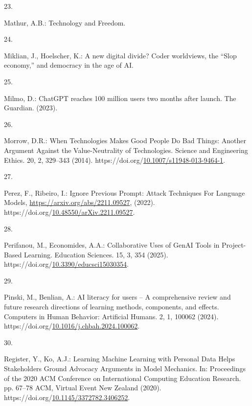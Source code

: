\documentclass[
  letterpaper,
  DIV=11,
  numbers=noendperiod]{scrartcl}
\newlength{\cslhangindent}
\newlength{\csllabelwidth}
\newenvironment{CSLReferences}[2] %
 {\begin{list}{}{%
  \setlength{\itemindent}{0pt}
  \setlength{\leftmargin}{0pt}
  \setlength{\parsep}{0pt}
  \ifodd #1
   \setlength{\leftmargin}{\cslhangindent}
   \setlength{\itemindent}{-1\cslhangindent}
  \fi
  \setlength{\itemsep}{#2\baselineskip}}}
 {\end{list}}
\newcommand{\CSLLeftMargin}[1]{\parbox[t]{\csllabelwidth}{\strut#1\strut}}
\newcommand{\CSLRightInline}[1]{\parbox[t]{\linewidth - \csllabelwidth}{\strut#1\strut}}
\begin{document}
\begin{CSLReferences}{0}{0}
\CSLLeftMargin{23. }%
\CSLRightInline{Mathur, A.B.: Technology and {Freedom}.}

\CSLLeftMargin{24. }%
\CSLRightInline{Miklian, J., Hoelscher, K.: A new digital divide?
{Coder} worldviews, the {``{Slop} economy,''} and democracy in the age
of {AI}.}

\CSLLeftMargin{25. }%
\CSLRightInline{Milmo, D.: {ChatGPT} reaches 100 million users two
months after launch. The Guardian. (2023).}

\CSLLeftMargin{26. }%
\CSLRightInline{Morrow, D.R.: When {Technologies Makes Good People Do
Bad Things}: {Another Argument Against} the {Value-Neutrality} of
{Technologies}. Science and Engineering Ethics. 20, 2, 329--343 (2014).
https://doi.org/\href{https://doi.org/10.1007/s11948-013-9464-1}{10.1007/s11948-013-9464-1}.}

\CSLLeftMargin{27. }%
\CSLRightInline{Perez, F., Ribeiro, I.: Ignore {Previous Prompt}:
{Attack Techniques For Language Models},
\url{https://arxiv.org/abs/2211.09527}, (2022).
https://doi.org/\href{https://doi.org/10.48550/arXiv.2211.09527}{10.48550/arXiv.2211.09527}.}

\CSLLeftMargin{28. }%
\CSLRightInline{Perifanou, M., Economides, A.A.: Collaborative {Uses} of
{GenAI Tools} in {Project-Based Learning}. Education Sciences. 15, 3,
354 (2025).
https://doi.org/\href{https://doi.org/10.3390/educsci15030354}{10.3390/educsci15030354}.}

\CSLLeftMargin{29. }%
\CSLRightInline{Pinski, M., Benlian, A.: {AI} literacy for users -- {A}
comprehensive review and future research directions of learning methods,
components, and effects. Computers in Human Behavior: Artificial Humans.
2, 1, 100062 (2024).
https://doi.org/\href{https://doi.org/10.1016/j.chbah.2024.100062}{10.1016/j.chbah.2024.100062}.}

\CSLLeftMargin{30. }%
\CSLRightInline{Register, Y., Ko, A.J.: Learning {Machine Learning} with
{Personal Data Helps Stakeholders Ground Advocacy Arguments} in {Model
Mechanics}. In: Proceedings of the 2020 {ACM Conference} on
{International Computing Education Research}. pp. 67--78 ACM, Virtual
Event New Zealand (2020).
https://doi.org/\href{https://doi.org/10.1145/3372782.3406252}{10.1145/3372782.3406252}.}


\end{CSLReferences}
\end{document}
